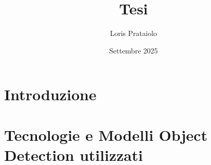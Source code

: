 \documentclass[a4paper,10pt]{report}
\title{Tesi}
\author{Loris Prataiolo}
\date{Settembre 2025}
\begin{document}







\tableofcontents



\chapter{Introduzione}





\chapter{Tecnologie e Modelli Object Detection utilizzati}



~\cite{*}


\end{document}
